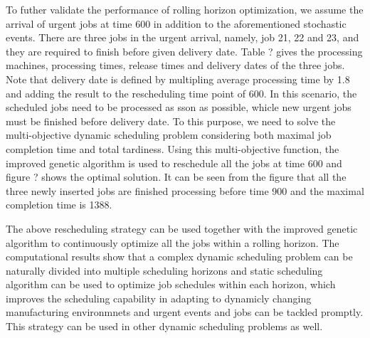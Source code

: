 To futher validate the performance of rolling horizon optimization, we assume the arrival of urgent jobs at time 600 in addition to the aforementioned stochastic events.
There are three jobs in the urgent arrival, namely, job 21, 22 and 23, and they are required to finish before given delivery date.
Table ? gives the processing machines, processing times, release times and delivery dates of the three jobs.
Note that delivery date is defined by multipling average processing time by 1.8 and adding the result to the rescheduling time point of 600.
In this scenario, the scheduled jobs need to be processed as sson as possible, whicle new urgent jobs must be finished before delivery date.
To this purpose, we need to solve the multi-objective dynamic scheduling problem considering both maximal job completion time and total tardiness. 
Using this multi-objective function, the improved genetic algorithm is used to reschedule all the jobs at time 600 and figure ? shows the optimal solution.
It can be seen from the figure that all the three newly inserted jobs are finished processing before time 900 and the maximal completion time is 1388.

The above rescheduling strategy can be used together with the improved genetic algorithm to continuously optimize all the jobs within a rolling horizon.
The computational results show that a complex dynamic scheduling problem can be naturally divided into multiple scheduling horizons and static scheduling algorithm can be used to optimize job schedules within each horizon, which improves the scheduling capability in adapting to dynamicly changing manufacturing environmnets and urgent events and jobs can be tackled promptly.
This strategy can be used in other dynamic scheduling problems as well.